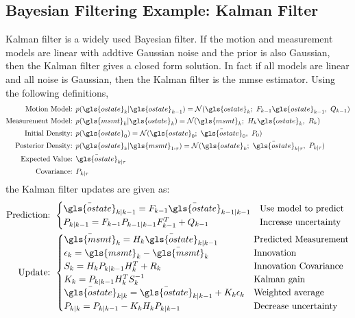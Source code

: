 \documentclass[a4paper]{article}
\begin{document}
\subsection{Bayesian Filtering Example: Kalman Filter}
Kalman filter is a widely used Bayesian filter. If the motion and measurement models are linear with addtive Gaussian noise and the prior is also Gaussian, then the Kalman filter gives a closed form solution. In fact if all models are linear and all noise is Gaussian, then the Kalman filter is the \gls{mmse} estimator. Using the following definitions,
\begin{align}
	\text{Motion Model: }&p(\gls{ostate}_k|\gls{ostate}_{k-1}) = \mathcal{N}(\gls{ostate}_k;~F_{k-1}\gls{ostate}_{k-1}, ~Q_{k-1})\nonumber\\
	\text{Measurement Model: }&p(\gls{msmt}_k|\gls{ostate}_k) =  \mathcal{N}(\gls{msmt}_k; ~H_k\gls{ostate}_k, ~R_k)\nonumber\\
	\text{Initial Density: }&p(\gls{ostate}_0) =  \mathcal{N}(\gls{ostate}_0; ~\bar{\gls{ostate}}_0, ~P_0)\nonumber\\
	\text{Posterior Density: }&p(\gls{ostate}_k|\gls{msmt}_{1:\tau}) =  \mathcal{N}(\gls{ostate}_k; ~\bar{\gls{ostate}}_{k|\tau}, ~P_{k|\tau})\nonumber\\
	\text{Expected Value: }&\bar{\gls{ostate}}_{k|\tau}\nonumber\\
	\text{Covariance: }&P_{k|\tau}\nonumber
\end{align}
the Kalman filter updates are given as:
\begin{align}
	\text{Prediction: }&\begin{cases}
		\bar{\gls{ostate}}_{k|k-1}=F_{k-1}\bar{\gls{ostate}}_{k-1|k-1} &\text{Use model to predict}\\
		P_{k|k-1}=F_{k-1}P_{k-1|k-1}F_{k-1}^T+Q_{k-1} &\text{Increase uncertainty}
	\end{cases}\nonumber\\
	\text{Update: }&\begin{cases}
		\bar{\gls{msmt}}_k=H_k\bar{\gls{ostate}}_{k|k-1} &\text{Predicted Measurement}\\
		\epsilon_k=\gls{msmt}_k-\bar{\gls{msmt}}_k &\text{Innovation}\\
		S_k=H_kP_{k|k-1}H_k^T+R_k &\text{Innovation Covariance}\\
		K_k=P_{k|k-1}H_k^TS_k^{-1} &\text{Kalman gain}\\
		\bar{\gls{ostate}}_{k|k}=\bar{\gls{ostate}}_{k|k-1} + K_k\epsilon_k &\text{Weighted average}\\
		P_{k|k}=P_{k|k-1} - K_kH_kP_{k|k-1} &\text{Decrease uncertainty}
	\end{cases}\nonumber
\end{align}
\end{document}
